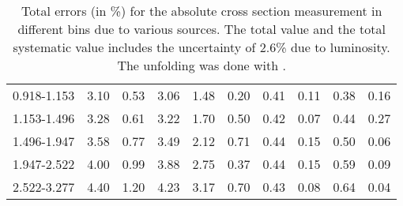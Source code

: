 \begin{table}
\begin{center}
\begin{tabular}{@{}l l l l l l l l l l@{}}
            0.918-1.153     &  3.10   &  0.53   &  3.06         &  1.48      &  0.20    &  0.41  &  0.11       &  0.38  &  0.16  \\
            1.153-1.496     &  3.28   &  0.61   &  3.22         &  1.70      &  0.50    &  0.42  &  0.07       &  0.44  &  0.27  \\
            1.496-1.947     &  3.58   &  0.77   &  3.49         &  2.12      &  0.71    &  0.44  &  0.15       &  0.50  &  0.06  \\
            1.947-2.522     &  4.00   &  0.99   &  3.88         &  2.75      &  0.37    &  0.44  &  0.15       &  0.59  &  0.09  \\
            2.522-3.277     &  4.40   &  1.20   &  4.23         &  3.17      &  0.70    &  0.43  &  0.08       &  0.64  &  0.04  \\
            \bottomrule
        \end{tabular}
    \end{center}
    \caption[
        Total errors (in \%) for the absolute cross section measurement with
        \POWHEG unfolding.
    ]{
        Total errors (in \%) for the absolute cross section measurement in
        different \phistar bins due to various sources. The total value and the
        total systematic value includes the uncertainty of 2.6\% due to
        luminosity. The unfolding was done with \POWHEG.
    }
    \label{tab:sys_uncert_abs_powheg}
\end{table}
